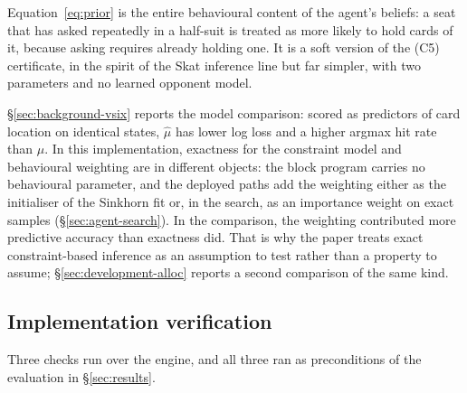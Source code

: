 Equation~\eqref{eq:prior} is the entire behavioural content of the agent's beliefs: a seat that has
asked repeatedly in a half-suit is treated as more likely to hold cards of it, because asking
requires already holding one. It is a soft version of the (C5) certificate, in the spirit of the Skat
inference line \cite{solinas-supervised,rebstock-inference,buro-kermit} but far simpler, with two
parameters and no learned opponent model.

\S\ref{sec:background-vsix} reports the model comparison: scored as predictors of card location on
identical states, $\hat\mu$ has lower log loss and a higher argmax hit rate than $\mu$. In this
implementation, exactness for the constraint model and behavioural weighting are in different
objects: the block program carries no behavioural parameter, and the deployed paths add the
weighting either as the initialiser of the Sinkhorn fit or, in the search, as an importance weight
on exact samples (\S\ref{sec:agent-search}). In the comparison, the weighting contributed more
predictive accuracy than exactness did. That is why the
paper treats exact constraint-based inference as an assumption to test rather than a property to
assume; \S\ref{sec:development-alloc} reports a second comparison of the same kind.

\subsection{Implementation verification}
\label{sec:inference-verify}

Three checks run over the engine, and all three ran as preconditions of the evaluation in
\S\ref{sec:results}.

